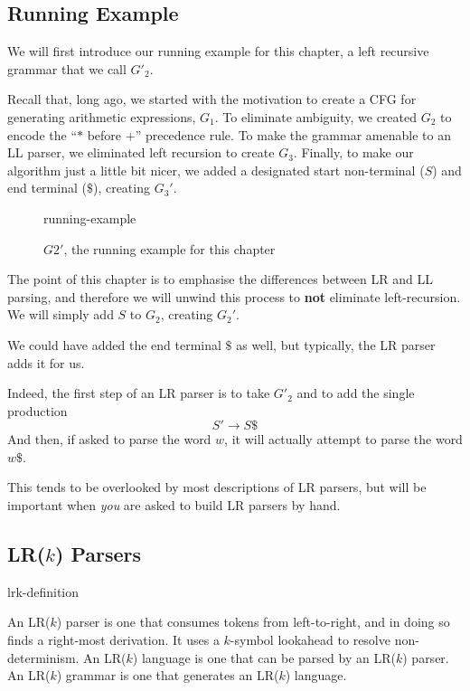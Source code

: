 \subsection{Running Example}\label{section:lr-running-example}
We will first introduce our running example for this chapter, a left recursive grammar that we call $G'_2$.

Recall that, long ago, we started with the motivation to create a CFG for generating arithmetic expressions, $G_1$. To eliminate ambiguity, we created $G_2$ to encode the ``$*$ before $+$'' precedence rule. To make the grammar amenable to an LL parser, we eliminated left recursion to create $G_3$. Finally, to make our algorithm just a little bit nicer, we added a designated start non-terminal ($S$) and end terminal ($\$$), creating $G_3'$.

\begin{figure}[H]
    \centering
    {running-example}
    \caption{$G2'$, the running example for this chapter}
    \label{fig:g2-prime-example}
\end{figure}

The point of this chapter is to emphasise the differences between LR and LL parsing, and therefore we will unwind this process to \textbf{not} eliminate left-recursion. We will simply add $S$ to $G_2$, creating $G_2'$. 

We could have added the end terminal $\$$ as well, but typically, the LR parser adds it for us.

Indeed, the first step of an LR parser is to take $G'_2$ and to add the single production
\[S' \to S\$\]
And then, if asked to parse the word $w$, it will actually attempt to parse the word $w\$$. 

This tends to be overlooked by most descriptions of LR parsers, but will be important when \textit{you} are asked to build LR parsers by hand.

\subsection{LR($k$) Parsers}\label{section:lr-definition}
\begin{center}
    {lrk-definition}
\end{center}

An LR($k$) parser is one that consumes tokens from left-to-right, and in doing so finds a right-most derivation. It uses a $k$-symbol lookahead to resolve non-determinism. An LR($k$) language is one that can be parsed by an LR($k$) parser. An LR($k$) grammar is one that generates an LR($k$) language.

